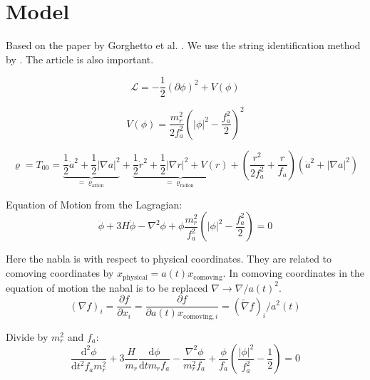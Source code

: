\documentclass[a4paper]{article}
\begin{document}
\section{Model}

Based on the paper by Gorghetto et al. \cite{axions_from_strings}.
We use the string identification method by \cite{axion_dark_matter_strings_and_their_cores}.
The article \cite{improved_estimation_hiramatsu} is also important.

\begin{equation}
    \mathcal{L} = - \frac{1}{2} ( \partial \phi )^2 + V(\phi)
\end{equation}

\begin{equation}
    V(\phi) = \frac{m_r^2}{2 f_a^2}\left( |\phi|^2 - \frac{f_a^2}{2} \right)^2
\end{equation}

\begin{equation}
    \varrho = T_{00} = \underbrace{\frac{1}{2} \dot{a}^2 + \frac{1}{2} | \nabla a|^2}_{= \varrho_\mathrm{axion}}
    + \underbrace{ \frac{1}{2} \dot{r}^2 + \frac{1}{2} | \nabla r|^2 + V(r) }_{= \varrho_\mathrm{radion}}
    + \left(\frac{r^2}{2 f_a^2} + \frac{r}{f_a} \right) (\dot{a}^2 + |\nabla a|^2)
\end{equation}

Equation of Motion from the Lagragian:
\begin{equation}
    \ddot{\phi} + 3 H \dot{\phi} - \nabla^2 \phi + \phi \frac{m_r^2}{f_a^2} \left( |\phi|^2 - \frac{f_a^2}{2} \right) = 0
\end{equation}

Here the nabla is with respect to physical coordinates. They are related to comoving  coordinates by $x_\mathrm{physical} = a(t) x_\mathrm{comoving}$.
In comoving coordinates in the equation of motion the nabal is to be replaced $\nabla \to \nabla / a(t)^2$.
\begin{equation}
    (\nabla f)_i = \frac{\partial f}{\partial x_i} = \frac{\partial f}{\partial a(t) x_{\mathrm{comoving}, i}} = (\tilde{\nabla} f)_i / a^2(t)
\end{equation}


Divide by $m_r^2$ and $f_a$:
\begin{equation}
    \frac{\mathrm{d}^2 {\phi}}{\mathrm{d} t^2 f_a m_r^2} + 3 \frac{H}{m_r} \frac{\mathrm{d} \phi}{\mathrm{d} t m_r f_a} - \frac{\nabla^2 \phi}{m_r^2 f_a} + \frac{\phi}{f_a} \left( \frac{ |\phi|^2 } { f_a^2 } - \frac{1}{2} \right) = 0
\end{equation}
\end{document}
